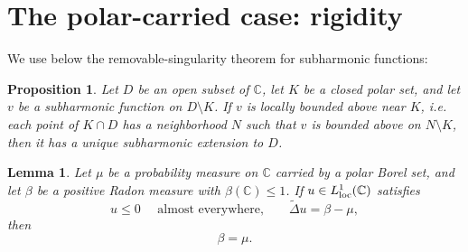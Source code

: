 \documentclass[10pt,reqno]{amsart}
\newtheorem{proposition}[theorem]{Proposition}
\newtheorem{lemma}[theorem]{Lemma}
\theoremstyle{remark}
\newcommand{\C}{\mathbb C}
\begin{document}
\section{The polar-carried case: rigidity}\label{sec:polar}
We use below the removable-singularity theorem for subharmonic functions:

\begin{proposition}\cite[Theorem~3.6.1]{Ran95}\label{prop:polar-removability}
    Let $D$ be an open subset of $\C$, let $K$ be a closed polar set, and let $v$ be a subharmonic function on $D\setminus K$. If $v$ is locally bounded above near $K$, i.e. each point of $K\cap D$ has a neighborhood $N$ such that $v$ is bounded above on $N\setminus K$, then it has a unique subharmonic extension to $D$.
\end{proposition}

\begin{lemma}\label{lem:polar-rigidity}
    Let $\mu$ be a probability measure on $\C$ carried by a polar Borel set, and let $\beta$ be a positive Radon measure with $\beta(\C)\le 1$. If $u\in L^1_{\rm loc}(\C)$ satisfies
    \[u\le 0\quad\text{ almost everywhere,}\qquad \widetilde{\Delta}u=\beta-\mu,\]
    then 
    \[\beta=\mu.\]
\end{lemma}
\end{document}
